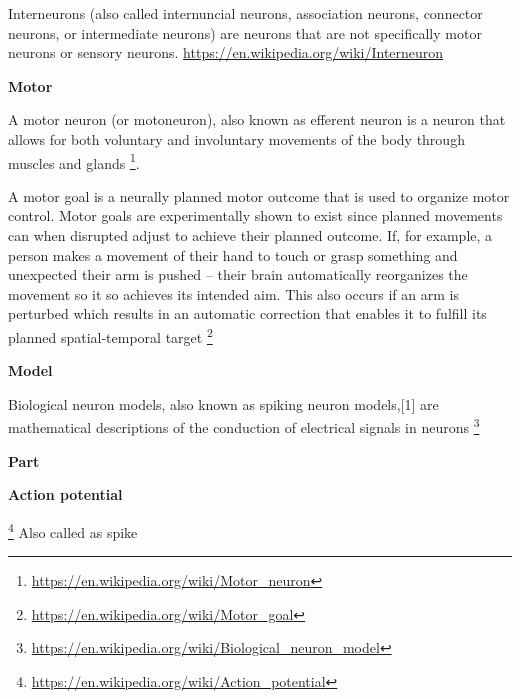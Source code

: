 \documentclass{book}
\providecommand{\ProjectDeepHeading}[2]{%
    \par\medskip\noindent\textbf{#2}\par\smallskip
}
\providecommand{\seeherefooter}[1]{\footnote{\url{#1}}}
\begin{document}

Interneurons (also called internuncial neurons, association neurons, connector neurons, or intermediate neurons) are neurons that are not specifically motor neurons or sensory neurons. \url{https://en.wikipedia.org/wiki/Interneuron}

\ProjectDeepHeading{4}{Motor}


A motor neuron (or motoneuron), also known as efferent neuron is a neuron that allows for both voluntary and involuntary movements of the body through muscles and glands \seeherefooter{https://en.wikipedia.org/wiki/Motor_neuron}.


A motor goal is a neurally planned motor outcome that is used to organize motor control.
    Motor goals are experimentally shown to exist since planned movements can when disrupted adjust to achieve their planned outcome. If, for example, a person makes a movement of their hand to touch or grasp something and unexpected their arm is pushed – their brain automatically reorganizes the movement so it so achieves its intended aim. This also occurs if an arm is perturbed which results in an automatic correction that enables it to fulfill its planned spatial-temporal target \seeherefooter{https://en.wikipedia.org/wiki/Motor_goal}

\ProjectDeepHeading{3}{Model}


Biological neuron models, also known as spiking neuron models,[1] are mathematical descriptions of the conduction of electrical signals in neurons \seeherefooter{https://en.wikipedia.org/wiki/Biological_neuron_model}

\ProjectDeepHeading{3}{Part}

\ProjectDeepHeading{4}{Action potential}


\seeherefooter{https://en.wikipedia.org/wiki/Action_potential}
    Also called as spike
    
    
    
\end{document}
